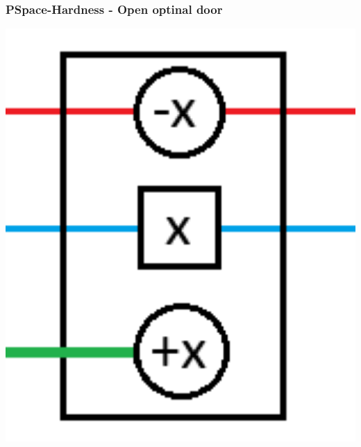 \documentclass{beamer}
\begin{document}
\begin{frame}
  \frametitle{PSpace-Hardness - Open optinal door}
  \begin{minipage}[t]{0.49\textwidth}
    \includegraphics[width=1\textwidth]{res/DoorOpenOptional.png}
  \end{minipage}
  \begin{minipage}[t]{0.49\textwidth}

\end{minipage}
\end{frame}
\end{document}
